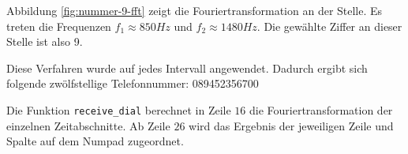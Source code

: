 \documentclass[a4paper]{article}
\begin{document}
Abbildung \ref{fig:nummer-9-fft} zeigt die Fouriertransformation an der Stelle. Es treten die Frequenzen $f_1\approx850\si{Hz}$ und $f_2\approx1480\si{Hz}$. Die gewählte Ziffer an dieser Stelle ist also 9.

Diese Verfahren wurde auf jedes Intervall angewendet. Dadurch ergibt sich folgende zwölfstellige Telefonnummer: 089452356700

Die Funktion \lstinline{receive_dial} berechnet in Zeile $16$ die Fouriertransformation der einzelnen Zeitabschnitte. Ab Zeile $26$ wird das Ergebnis der jeweiligen Zeile und Spalte auf dem Numpad zugeordnet.
\end{document}
